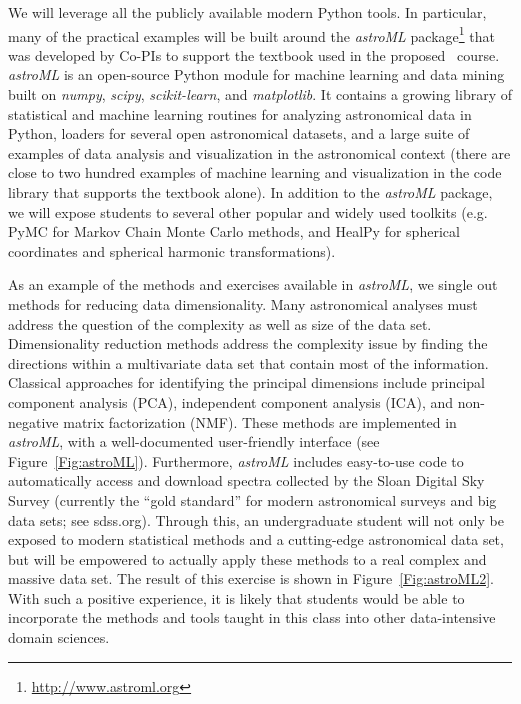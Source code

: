 We will leverage all the publicly available modern Python tools. In
particular, many of the practical examples
will be built around the {\it astroML}
package\footnote{\url{http://www.astroml.org}} that was developed by
Co-PIs to support the textbook used in the proposed \astrocl\
course. {\it astroML} is an open-source Python module for machine learning
and data mining built on {\it numpy}, {\it scipy}, {\it scikit-learn},
and {\it matplotlib}. It
contains a growing library of statistical and machine learning
routines for analyzing astronomical data in Python, loaders for
several open astronomical datasets, and a large suite of examples of
data analysis and visualization in the astronomical context
(there are close to
two hundred examples of machine learning and visualization in the code
library that supports the textbook alone). In addition to the {\it
  astroML} package, we will expose students to several other popular
and widely used toolkits (e.g. PyMC for Markov Chain Monte Carlo
methods, and HealPy for spherical coordinates and spherical harmonic
transformations).

As an example of the methods and exercises available in {\it astroML}, we
single out methods for reducing data dimensionality. Many astronomical
analyses must address the question of the complexity as well as size
of the data set. Dimensionality reduction methods address the
complexity issue by finding the directions within a multivariate data
set that contain most of the information. Classical approaches for
identifying the principal dimensions include principal component
analysis (PCA), independent component analysis (ICA), and non-negative
matrix factorization (NMF). These methods are implemented in {\it
  astroML}, with a well-documented user-friendly interface
(see Figure~\ref{Fig:astroML}). Furthermore, {\it astroML} 
includes easy-to-use code to automatically access and download spectra
collected by the Sloan Digital Sky Survey (currently the ``gold
standard'' for modern astronomical surveys and big data sets; see
sdss.org).  Through this, an undergraduate student will not only be
exposed to modern statistical methods and a cutting-edge astronomical
data set, but will be empowered to actually apply these methods to a
real complex and massive data set.  The result of this exercise is
shown in Figure~\ref{Fig:astroML2}.  With such a positive experience,
it is likely that students would be able to incorporate the methods
and tools taught in this class into other data-intensive domain sciences.

